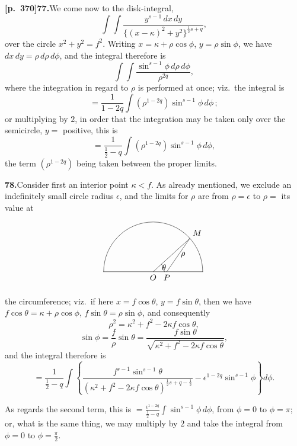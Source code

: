 \documentclass[11pt]{article}
\begin{document}
\bigskip
\bigskip

\noindent\textbf{[p.~370]}\quad \textbf{77.}\quad We come now to the disk-integral,
\[
\int\!\!\int\frac{y^{s-1}\,dx\,dy}{\{(x-\kappa)^{2}+y^{2}\}^{\frac{1}{2}s+q}},
\]
over the circle $x^{2}+y^{2}=f^{2}$. Writing $x=\kappa+\rho\cos\phi$, $y=\rho\sin\phi$, we have $dx\,dy=\rho\,d\rho\,d\phi$, and the integral therefore is
\[
\int\!\!\int\frac{\sin^{s-1}\phi\,d\rho\,d\phi}{\rho^{2q}},
\]
where the integration in regard to $\rho$ is performed at once; viz.\ the integral is
\[
= \frac{1}{1-2q}\int(\rho^{1-2q})\sin^{s-1}\phi\,d\phi\,;
\]
or multiplying by $2$, in order that the integration may be taken only over the semicircle, $y=$ positive, this is
\[
= \frac{1}{\tfrac{1}{2}-q}\int(\rho^{1-2q})\sin^{s-1}\phi\,d\phi,
\]
the term $(\rho^{1-2q})$ being taken between the proper limits.

\bigskip

\noindent\textbf{78.}\quad Consider first an interior point $\kappa<f$. As already mentioned, we exclude an indefinitely small circle radius $\epsilon$, and the limits for $\rho$ are from $\rho=\epsilon$ to $\rho=$ its value at

\bigskip

\[
\begin{tikzpicture}[scale=1.05,line cap=round,line join=round]
  \coordinate (O) at (0,0);
  \coordinate (P) at (0.55,0);
  \coordinate (M) at (1.48,1.34);
  \draw (-2,0) -- (2,0);
  \draw (-2,0) arc[start angle=180,end angle=0,radius=2];
  \draw (O) -- (M);
  \draw (P) -- (M);
  \draw (0.45,0) arc[start angle=0,end angle=42,radius=0.45];
  \node[below] at (O) {$O$};
  \node[below] at (P) {$P$};
  \node[above right] at (M) {$M$};
  \node at (0.44,0.18) {$\theta$};
  \node[right] at (1.0,0.68) {$\rho$};
\end{tikzpicture}
\]

\bigskip

\noindent the circumference; viz.\ if here $x=f\cos\theta$, $y=f\sin\theta$, then we have $f\cos\theta=\kappa+\rho\cos\phi$, $f\sin\theta=\rho\sin\phi$, and consequently
\[
\rho^{2} = \kappa^{2}+f^{2}-2\kappa f\cos\theta,
\]
\[
\sin\phi = \frac{f}{\rho}\sin\theta
= \frac{f\sin\theta}{\sqrt{\kappa^{2}+f^{2}-2\kappa f\cos\theta}},
\]
and the integral therefore is
\[
= \frac{1}{\tfrac{1}{2}-q}\int\!\left\{\frac{f^{s-1}\sin^{s-1}\theta}{(\kappa^{2}+f^{2}-2\kappa f\cos\theta)^{\frac{1}{2}s+q-\frac{1}{2}}} - \epsilon^{1-2q}\sin^{s-1}\phi\right\}d\phi.
\]

As regards the second term, this is $\displaystyle =\frac{\epsilon^{1-2q}}{\tfrac{1}{2}-q}\int\sin^{s-1}\phi\,d\phi$, from $\phi=0$ to $\phi=\pi$; or, what is the same thing, we may multiply by $2$ and take the integral from $\phi=0$ to $\phi=\tfrac{\pi}{2}$.
\end{document}
